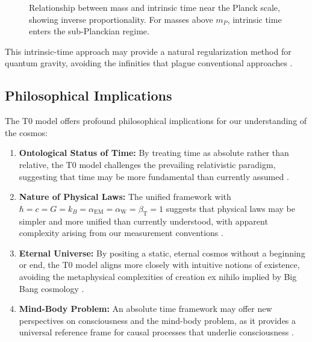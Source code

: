 \documentclass[12pt,a4paper]{article}
\newcommand{\alphaEM}{\alpha_{\text{EM}}}
\newcommand{\alphaW}{\alpha_{\text{W}}}
\newcommand{\betaT}{\beta_{\text{T}}}
\begin{document}
	\begin{figure}[H]
		\centering
		\caption{Relationship between mass and intrinsic time near the Planck scale, showing inverse proportionality. For masses above \(m_P\), intrinsic time enters the sub-Planckian regime.}
		\label{fig:mass_time}
	\end{figure}
	
	This intrinsic-time approach may provide a natural regularization method for quantum gravity, avoiding the infinities that plague conventional approaches \cite{pascher_planck_2025}.
	
	\subsection{Philosophical Implications}
	\label{subsec:philosophical_reflections}
	
	The T0 model offers profound philosophical implications for our understanding of the cosmos:
	
	\begin{enumerate}
		\item \textbf{Ontological Status of Time:} By treating time as absolute rather than relative, the T0 model challenges the prevailing relativistic paradigm, suggesting that time may be more fundamental than currently assumed \cite{pascher_perspective_2025}.
		
		\item \textbf{Nature of Physical Laws:} The unified framework with \(\hbar = c = G = k_B = \alphaEM = \alphaW = \betaT = 1\) suggests that physical laws may be simpler and more unified than currently understood, with apparent complexity arising from our measurement conventions \cite{pascher_alpha_2025}.
		
		\item \textbf{Eternal Universe:} By positing a static, eternal cosmos without a beginning or end, the T0 model aligns more closely with intuitive notions of existence, avoiding the metaphysical complexities of creation ex nihilo implied by Big Bang cosmology \cite{pascher_perspective_2025}.
		
		\item \textbf{Mind-Body Problem:} An absolute time framework may offer new perspectives on consciousness and the mind-body problem, as it provides a universal reference frame for causal processes that underlie consciousness \cite{pascher_dualismus_2025}.
	\end{enumerate}
	
\end{document}
